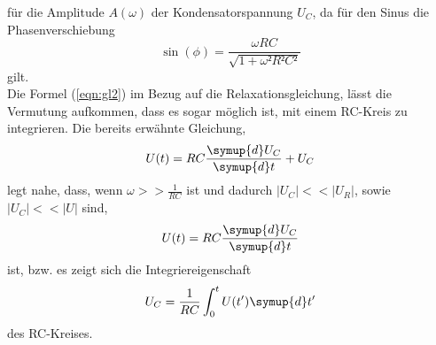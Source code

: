 für die Amplitude $A(\omega)$ der Kondensatorspannung $U_C$, da für den Sinus die Phasenverschiebung
\begin{equation}
  \sin(\phi) = \frac{\omega RC}{\sqrt{1 + \omega² R²C²}} \label{fuck2}
\end{equation}
gilt.\\
Die Formel (\ref{eqn:gl2}) im Bezug auf die Relaxationsgleichung, lässt die Vermutung aufkommen, dass es sogar möglich ist, mit einem RC-Kreis zu integrieren.
Die bereits erwähnte Gleichung,
\begin{equation}
  U(t) = RC\frac{\symup{d} U_C}{\symup{d} t} + U_C
\end{equation}
legt nahe, dass, wenn $\omega>>\frac{1}{RC}$ ist und dadurch $|U_C| << |U_R|$, sowie $|U_C| << |U|$ sind,
\begin{equation}
  U(t) = RC\frac{\symup{d} U_C}{\symup{d} t}
\end{equation}
ist, bzw. es zeigt sich die Integriereigenschaft
\begin{equation}
  U_C = \frac{1}{RC}\int_0^t U(t')\symup{d}t'
\end{equation}
des RC-Kreises.
